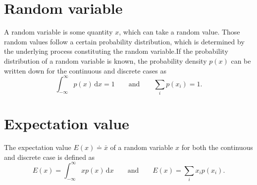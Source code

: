 \documentclass{report}
\numberwithin{tm}{section}
\begin{document}
\section{Random variable}
A random variable is some quantity $x$, which can take a random value. Those random values follow a certain probability distribution, which is determined by the underlying process constituting the random variable.If the probability distribution of a random variable is known, the probability density $p(x)$ can be written down for the continuous and discrete cases as \begin{equation}
	\int_{-\infty}^{\infty}p(x)\,\mathrm{d}x = 1 \qquad \text{and} \qquad \sum_{i} p(x_i) = 1.
	\end{equation}

\section{Expectation value}
The expectation value $E(x) \doteq \bar{x}$ of a random variable $x$ for both the continuous and discrete case is defined as \begin{equation}
	E(x) = \int_{-\infty}^{\infty}xp(x)\,\mathrm{d}x \qquad \text{and} \qquad E(x) = \sum_{i}x_ip(x_i).
\end{equation}
\end{document}
